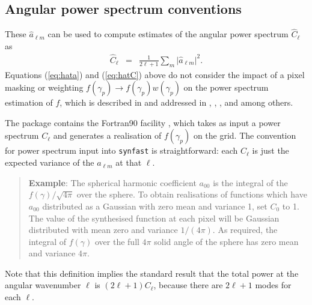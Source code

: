 \documentclass[12pt,twoside]{article}
\newcommand{\myhtmlimage}[1]{ }
\begin{document}

\subsection{Angular power spectrum conventions}
These $\hat{a}_{\ell m}$ can be used to compute estimates of the angular power spectrum
 $\hat{C}_\ell$ as 
\begin{eqnarray}
  \hat{C}_\ell &=&\frac{1}{2\ell +1}\sum_{m} \vert\hat{a}_{\ell m}\vert^2.\myhtmlimage{}\label{eq:hatC}
\end{eqnarray}
Equations (\ref{eq:hata}) and (\ref{eq:hatC}) above do not consider the impact of a pixel masking or weighting 
$f(\gamma_p) \longrightarrow f(\gamma_p) w(\gamma_p)$ 
on the power spectrum estimation of $f$, which is described in 
\citet{whg2001}
and addressed in
\citet{master}, \citet{polspice}, \citet{xspect}, \citet{xfaster} and
\citet{planck2015-11}
among others.

The \healpix package contains the Fortran90 facility 
, 
which takes as input a power spectrum $C_\ell$ and generates a realisation of
$f(\gamma_p)$
on the \healpix grid.  The convention for power spectrum input into
\texttt{synfast} is straightforward: each $C_\ell$ is just the expected
variance of the $a_{\ell m}$ at that $\ell$. 

\begin{verse}
\textbf{Example}: The spherical harmonic coefficient $a_{00}$ is the
integral of the $f(\gamma)/\sqrt{4 \pi}$ over the sphere. To 
obtain realisations of functions which have $a_{00}$ distributed as a Gaussian
with zero mean and variance 1, set $C_0$ to 1.  The value of the
synthesised function at each pixel will
be Gaussian distributed with mean zero and variance $1/(4\pi)$. 
As required,  the integral of $f(\gamma)$ over the full $4\pi$
solid angle of the sphere has zero mean and variance $4\pi$. 
\end{verse}
Note that this definition implies the standard result that the total power
at the angular wavenumber $\ell$ is $(2\ell+1)C_\ell$, because there are
$2\ell+1$ modes for each  $\ell$. 
\end{document}
